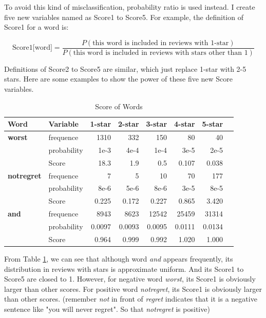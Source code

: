 \documentclass[UTF8]{article}
\begin{document}
To avoid this kind of misclassification, probability ratio is used instead. I create five new variables named as Score1 to Score5. For example, the definition of Score1 for a word is:

\[
\text{Score1[word]} = \frac{P(\text{this word is included in reviews with 1-star})}{P(\text{this word is included in reviews with stars other than 1})}    
\]

Definitions of Score2 to Score5 are similar, which just replace 1-star with 2-5 stars. Here are some examples to show the power of these five new Score variables.


\begin{table}[ht]
\centering %
\begin{tabular}{l l r r r r r r} %
	\hline %
	Word   &Variable  & 1-star & 2-star & 3-star & 4-star & 5-star  \\ [0.5ex] %
	\hline %
    \textbf{worst}         & frequence   & 1310   & 332     & 150     & 80      & 40      \\ 
    \cline{2-7} 
    & probability & 1e-3   & 4e-4    & 1e-4    & 3e-5    & 2e-5    \\ 
    \cline{2-7} 
    & Score       & 18.3   & 1.9     & 0.5     & 0.107   & 0.038   \\ 
    \hline
    \textbf{notregret} & frequence   & 7      & 5       & 10      & 70      & 177     \\ 
    \cline{2-7} 
    & probability & 8e-6   & 5e-6    & 8e-6    & 3e-5    & 8e-5    \\ 
    \cline{2-7} 
    & Score       & 0.225  & 0.172   & 0.227   & 0.865   & 3.420   \\ 
    \hline
	\hline
    \textbf{and}            & frequence   & 8943   & 8623    & 12542   & 25459   & 31314   \\ 
    \cline{2-7} 
    & probability & 0.0097 & 0.0093  & 0.0095  & 0.0111  & 0.0134  \\ 
    \cline{2-7} 
    & Score       & 0.964  & 0.999   & 0.992   & 1.020   & 1.000   \\ 
    \hline
\end{tabular}
\caption{Score of Words}
\label{table:score}
\end{table}

From Table \ref{table:score}, we can see that although word \textit{and} appears frequently, its distribution in reviews with stars is approximate uniform. And its Score1 to Score5 are closed to 1. However, for negative word \textit{worst}, its Score1 is obviously larger than other scores. For positive word \textit{notregret}, its Score1 is obviously larger than other scores. (remember \textit{not} in front of \textit{regret} indicates that it is a negative sentence like "you will never regret". So that \textit{notregret} is positive)
\end{document}
